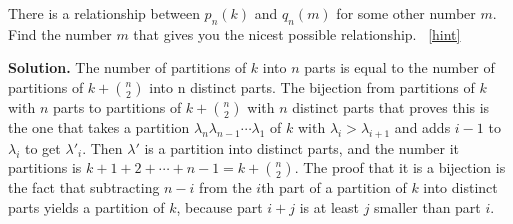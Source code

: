 \documentclass{book}
\begin{document}
\setcounter{project}{312}
\addtocounter{project}{-1}
\begin{activity}[]\label{activity-305}
\hypertarget{p-1611}{}%
There is a relationship between \(p_n(k)\) and \(q_n(m)\) for some other number \(m\). Find the number \(m\) that gives you the nicest possible relationship.%
~\hfill{\tiny\hyperlink{a-312}{[hint]}\hypertarget{q-312}{}}\par\smallskip%
\noindent\textbf{Solution.}\hypertarget{solution-240}{}\quad%
\hypertarget{p-1613}{}%
The number of partitions of \(k\) into \(n\) parts is equal to the number of partitions of \(k+\binom{n}{2}\) into n distinct parts.  The bijection from partitions of \(k\) with \(n\) parts to partitions of \(k+\binom{n}{2}\) with \(n\) distinct parts that proves this is the one that takes a partition \(\lambda_n\lambda_{n-1}\cdots\lambda_1\) of \(k\) with \(\lambda_i>\lambda_{i+1}\) and adds \(i-1\) to \(\lambda_i\) to get \(\lambda'_i\). Then \(\lambda'\) is a partition into distinct parts, and the number it partitions is \(k+1+2+\cdots+n-1=k+\binom{n}{2}\). The proof that it is a bijection is the fact that subtracting \(n-i\) from the \(i\)\/th part of a partition of \(k\) into distinct parts yields a partition of \(k\), because part \(i+j\) is at least \(j\) smaller than part \(i\).%
\end{activity}
\end{document}
